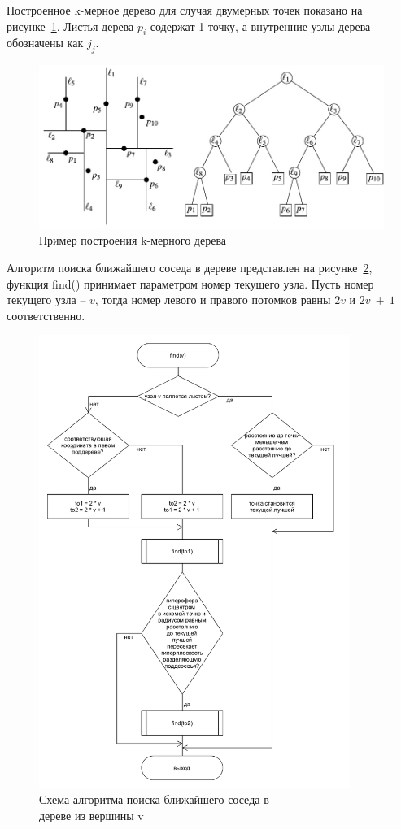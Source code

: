 \documentclass[14pt, a4paper]{extreport}
\begin{document}
	Построенное k-мерное дерево для случая двумерных точек показано на рисунке~\ref{fig:kdtreeexample}. Листья дерева $p_i$ содержат 1 точку, а внутренние узлы дерева обозначены как $j_j$.
	
	\begin{figure}[h!]
		\centering
		\includegraphics[width = 13cm]{image/chapter_2/kdtreeexample}	
		\caption{Пример построения k-мерного дерева}
		\label{fig:kdtreeexample}
	\end{figure}
	
	Алгоритм поиска ближайшего соседа в дереве представлен на рисунке~\ref{fig:kdtreealgo}, функция find() принимает параметром номер текущего узла. Пусть номер текущего узла -- $v$, тогда номер левого и правого потомков равны $2v$ и $2v~+~1$ соответственно.
	
	\begin{figure}[h!]
		\centering
		\includegraphics[width = 0.9\textwidth]{image/chapter_2/kdtreealgo}	
		\caption{Схема алгоритма поиска ближайшего соседа в \\ дереве из вершины v}
		\label{fig:kdtreealgo}
	\end{figure}
	
\end{document}
